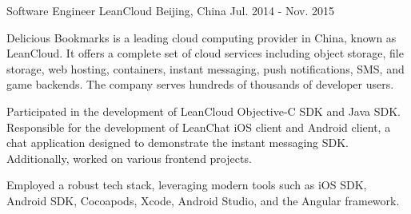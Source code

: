 \begin{cventries}
\cventry
{Software Engineer} %
{LeanCloud} %
{Beijing, China} %
{Jul. 2014 - Nov. 2015} %
{
  \begin{cvitems} %
    \item {Delicious Bookmarks is a leading cloud computing provider in China, known as LeanCloud. It offers a complete set of cloud services including object storage, file storage, web hosting, containers, instant messaging, push notifications, SMS, and game backends. The company serves hundreds of thousands of developer users.}
    \item {Participated in the development of LeanCloud Objective-C SDK and Java SDK. Responsible for the development of LeanChat iOS client and Android client, a chat application designed to demonstrate the instant messaging SDK. Additionally, worked on various frontend projects.}
    \item {Employed a robust tech stack, leveraging modern tools such as iOS SDK, Android SDK, Cocoapods, Xcode, Android Studio, and the Angular framework.}
  \end{cvitems}
}


\end{cventries}
